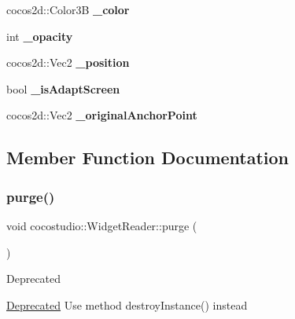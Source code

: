 \begin{DoxyCompactItemize}
\mbox{\label{classcocostudio_1_1WidgetReader_aebd6b832c148d602b939f7a1526d9ba4}} 
cocos2d\+::\+Color3B {\bfseries \+\_\+color}
\item 
\mbox{\label{classcocostudio_1_1WidgetReader_ac6ffa1b8f2dd3934a6db8c1fb510b4e3}} 
int {\bfseries \+\_\+opacity}
\item 
\mbox{\label{classcocostudio_1_1WidgetReader_a8727b3966237e5ef8dde33dc5ba79b82}} 
cocos2d\+::\+Vec2 {\bfseries \+\_\+position}
\item 
\mbox{\label{classcocostudio_1_1WidgetReader_aeec7c7dd7344d0a1f7624fc38719d9e3}} 
bool {\bfseries \+\_\+is\+Adapt\+Screen}
\item 
\mbox{\label{classcocostudio_1_1WidgetReader_ac35766f3e229b464e131fe2cb8b27684}} 
cocos2d\+::\+Vec2 {\bfseries \+\_\+original\+Anchor\+Point}
\end{DoxyCompactItemize}


\subsection{Member Function Documentation}
\mbox{\label{classcocostudio_1_1WidgetReader_af7aea963e2dc8f4d07adbd8db2f64e00}} 
\subsubsection{\texorpdfstring{purge()}{purge()}\hspace{0.1cm}{\footnotesize\ttfamily [1/2]}}
{\footnotesize\ttfamily void cocostudio\+::\+Widget\+Reader\+::purge (\begin{DoxyParamCaption}{ }\end{DoxyParamCaption})\hspace{0.3cm}{\ttfamily [static]}}

\begin{DoxyRefDesc}{Deprecated}
\item[\hyperlink{deprecated__deprecated000112}{Deprecated}]Use method destroy\+Instance() instead \end{DoxyRefDesc}
\mbox{\label{classcocostudio_1_1WidgetReader_a574f9b984629a98a258ff0c767e7b6ba}} 
